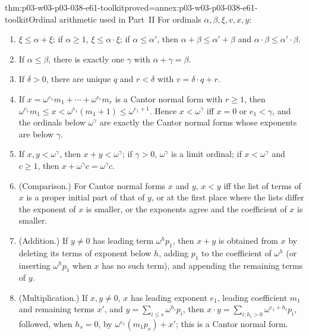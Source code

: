 \begin{hblemma}{thm:p03-w03-p03-038-e61-toolkit}{proved=annex:p03-w03-p03-038-e61-toolkit}{Ordinal arithmetic used in Part~II}
For ordinals \(\alpha,\beta,\xi,v,x,y\):
\begin{enumerate}
\item \(\xi\le\alpha+\xi\); if \(\alpha\ge1\), \(\xi\le\alpha\cdot\xi\);
      if \(\alpha\le\alpha'\), then \(\alpha+\beta\le\alpha'+\beta\) and
      \(\alpha\cdot\beta\le\alpha'\cdot\beta\).
\item If \(\alpha\le\beta\), there is exactly one \(\gamma\) with
      \(\alpha+\gamma=\beta\).
\item If \(\delta>0\), there are unique \(q\) and \(r<\delta\) with
      \(v=\delta\cdot q+r\).
\item If \(x=\omega^{e_1}m_1+\cdots+\omega^{e_r}m_r\) is a Cantor normal
      form with \(r\ge1\), then
      \(\omega^{e_1}m_1\le x<\omega^{e_1}(m_1+1)\le\omega^{e_1+1}\).
      Hence \(x<\omega^\gamma\) iff \(x=0\) or \(e_1<\gamma\), and the
      ordinals below \(\omega^\gamma\) are exactly the Cantor normal forms
      whose exponents are below \(\gamma\).
\item If \(x,y<\omega^\gamma\), then \(x+y<\omega^\gamma\); if
      \(\gamma>0\), \(\omega^\gamma\) is a limit ordinal; if
      \(x<\omega^\gamma\) and \(c\ge1\), then
      \(x+\omega^\gamma c=\omega^\gamma c\).
\item (Comparison.) For Cantor normal forms \(x\) and \(y\), \(x<y\) iff
      the list of terms of \(x\) is a proper initial part of that of
      \(y\), or at the first place where the lists differ the exponent of
      \(x\) is smaller, or the exponents agree and the coefficient of
      \(x\) is smaller.
\item (Addition.) If \(y\ne0\) has leading term \(\omega^hp_1\), then
      \(x+y\) is obtained from \(x\) by deleting its terms of exponent
      below \(h\), adding \(p_1\) to the coefficient of \(\omega^h\) (or
      inserting \(\omega^hp_1\) when \(x\) has no such term), and
      appending the remaining terms of \(y\).
\item (Multiplication.) If \(x,y\ne0\), \(x\) has leading exponent
      \(e_1\), leading coefficient \(m_1\) and remaining terms \(x'\), and
      \(y=\sum_{i\le s}\omega^{h_i}p_i\), then
      \(x\cdot y=\sum_{i:h_i>0}\omega^{e_1+h_i}p_i\), followed, when
      \(h_s=0\), by \(\omega^{e_1}(m_1p_s)+x'\); this is a Cantor normal
      form.
\end{enumerate}
\end{hblemma}

